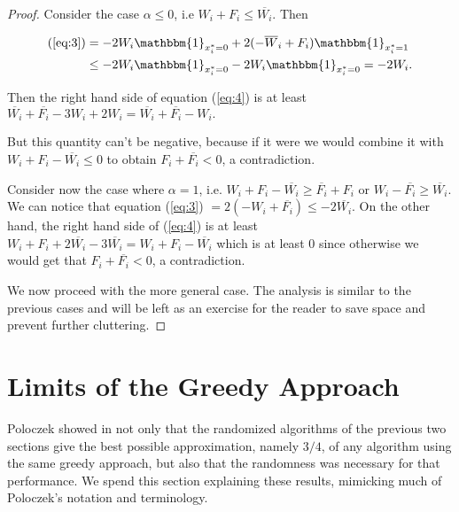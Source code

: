 \documentclass[11pt,letter]{article}
\numberwithin{theorem}{section}
\begin{document}
\begin{proof}
Consider the case $\alpha \leq 0$, i.e $W_i + F_i \leq \overline{W_i}$. Then

\begin{equation*}
\begin{aligned}
(\ref{eq:3}) & = -2W_i \mathbbm{1}_{x_i^* = 0} + 2(-\overline{W}_i + F_i) \mathbbm{1}_{x_i^* = 1} \\ 
& \leq  -2W_i \mathbbm{1}_{x_i^* = 0} - 2W_i \mathbbm{1}_{x_i^* = 0} = -2W_i.
\end{aligned}
\end{equation*}

Then the right hand side of equation (\ref{eq:4}) is at least $\overline{W_i} + \overline{F_i} - 3W_i + 2W_i =
\overline{W_i} + \overline{F_i} - W_i.$

But this quantity can't be negative, because if it were we would combine it with $W_i + F_i - \overline{W_i} \leq 0$ to obtain $F_i +
\overline{F_i} < 0$, a contradiction.

Consider now the case where $\alpha = 1$, i.e. $W_i + F_i -\overline{W_i} \geq \overline{F_i} + F_i$ or $W_i - \overline{F_i} \geq \overline{W_i}$.
We can notice that equation (\ref{eq:3}) $= 2(-W_i + \overline{F_i}) \leq -2\overline{W_i}$. On the other hand, the right hand side of  (\ref{eq:4})
is at least $W_i + F_i + 2\overline{W_i} -3\overline{W_i} = W_i + F_i - \overline{W_i}$ which is at least $0$ since otherwise we would get
that $F_i + \overline{F_i} < 0$, a contradiction.

We now proceed with the more general case. The analysis is similar to the previous cases and will be left as an exercise
for the reader to save space and prevent further cluttering.

\end{proof}


\section{Limits of the Greedy Approach}\label{S:limits}

Poloczek showed in \cite{DBLP:conf/esa/Poloczek11} not only that
the randomized algorithms of the previous two sections
give the best possible approximation, namely $3/4$,
of any algorithm using the same greedy approach,
but also that the randomness was necessary for that performance.
We spend this section explaining these results,
mimicking much of Poloczek's notation and terminology.
\end{document}
